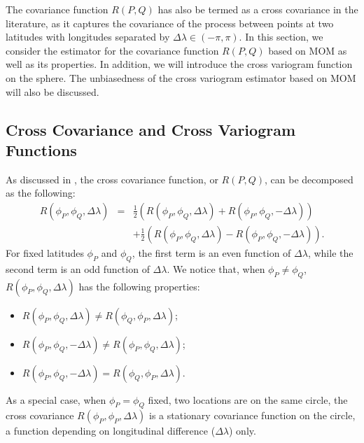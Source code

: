 The covariance function $R(P, Q)$ has also be termed as a cross covariance in the literature, as it captures the covariance of the process between points at two latitudes with longitudes separated by $\Delta \lambda \in (-\pi,\pi)$. In this section, we consider the estimator for the covariance function $R(P, Q)$ based on MOM as well as its properties. In addition, we will introduce the cross variogram function on the sphere. The unbiasedness of the cross variogram estimator based on MOM will also be discussed.


\subsection{Cross Covariance and Cross Variogram Functions}

As discussed in \cite{Wackernagel2013}, the cross covariance function, or $R(P, Q)$, can be decomposed as the following:
\begin{eqnarray*}
R(\phi_P, \phi_Q, \Delta \lambda) &=& \frac{1}{2}(R(\phi_P, \phi_Q, \Delta \lambda) + R(\phi_P, \phi_Q, -\Delta \lambda)) \\
& & + \frac{1}{2}(R(\phi_P, \phi_Q, \Delta \lambda) - R(\phi_P, \phi_Q, -\Delta \lambda)).
\end{eqnarray*}
For fixed latitudes $\phi_P$ and $\phi_Q$, the first term is an even function of $\Delta \lambda$, while the second term is an odd function of $\Delta \lambda$. We notice that, when $\phi_P \ne \phi_Q$, $R(\phi_P, \phi_Q, \Delta \lambda)$ has the following properties:
\begin{itemize}
\item $R(\phi_P, \phi_Q, \Delta \lambda) \ne R(\phi_Q, \phi_P, \Delta \lambda)$;
\item $R(\phi_P, \phi_Q, -\Delta \lambda) \ne R(\phi_P, \phi_Q, \Delta \lambda)$;
\item $R(\phi_P, \phi_Q, -\Delta \lambda) = R(\phi_Q, \phi_P, \Delta \lambda)$.
\end{itemize}
As a special case, when $\phi_P = \phi_Q$ fixed, two locations are on the same circle, the cross covariance $R(\phi_P, \phi_P, \Delta\lambda)$ is a stationary covariance function on the circle, a function depending on longitudinal difference ($\Delta\lambda$) only. \\

